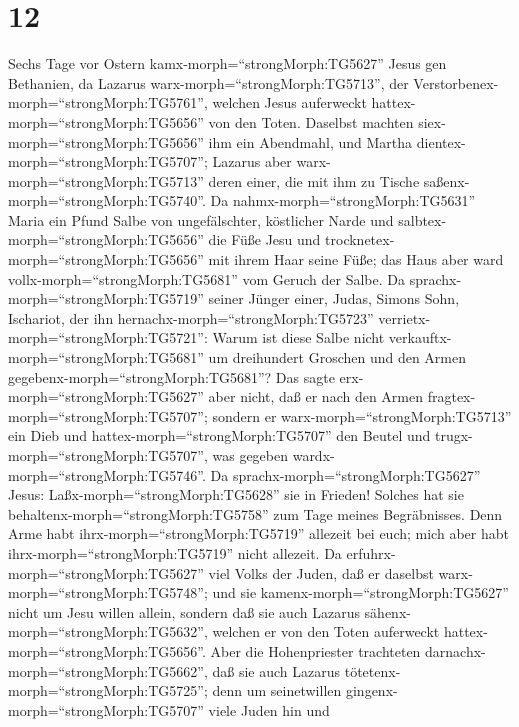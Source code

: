 \hypertarget{section-11}{%
\section{12}\label{section-11}}

 Sechs Tage vor Ostern kamx-morph=``strongMorph:TG5627''
Jesus gen Bethanien, da Lazarus warx-morph=``strongMorph:TG5713'', der
Verstorbenex-morph=``strongMorph:TG5761'', welchen Jesus auferweckt
hattex-morph=``strongMorph:TG5656'' von den Toten.  Daselbst
machten siex-morph=``strongMorph:TG5656'' ihm ein Abendmahl, und Martha
dientex-morph=``strongMorph:TG5707''; Lazarus aber
warx-morph=``strongMorph:TG5713'' deren einer, die mit ihm zu Tische
saßenx-morph=``strongMorph:TG5740''.  Da
nahmx-morph=``strongMorph:TG5631'' Maria ein Pfund Salbe von
ungefälschter, köstlicher Narde und salbtex-morph=``strongMorph:TG5656''
die Füße Jesu und trocknetex-morph=``strongMorph:TG5656'' mit ihrem Haar
seine Füße; das Haus aber ward vollx-morph=``strongMorph:TG5681'' vom
Geruch der Salbe.  Da sprachx-morph=``strongMorph:TG5719''
seiner Jünger einer, Judas, Simons Sohn, Ischariot, der ihn
hernachx-morph=``strongMorph:TG5723''
verrietx-morph=``strongMorph:TG5721'':  Warum ist diese
Salbe nicht verkauftx-morph=``strongMorph:TG5681'' um dreihundert
Groschen und den Armen gegebenx-morph=``strongMorph:TG5681''?
 Das sagte erx-morph=``strongMorph:TG5627'' aber nicht, daß
er nach den Armen fragtex-morph=``strongMorph:TG5707''; sondern er
warx-morph=``strongMorph:TG5713'' ein Dieb und
hattex-morph=``strongMorph:TG5707'' den Beutel und
trugx-morph=``strongMorph:TG5707'', was gegeben
wardx-morph=``strongMorph:TG5746''.  Da
sprachx-morph=``strongMorph:TG5627'' Jesus:
Laßx-morph=``strongMorph:TG5628'' sie in Frieden! Solches hat sie
behaltenx-morph=``strongMorph:TG5758'' zum Tage meines Begräbnisses.
 Denn Arme habt ihrx-morph=``strongMorph:TG5719'' allezeit
bei euch; mich aber habt ihrx-morph=``strongMorph:TG5719'' nicht
allezeit.  Da erfuhrx-morph=``strongMorph:TG5627'' viel
Volks der Juden, daß er daselbst warx-morph=``strongMorph:TG5748''; und
sie kamenx-morph=``strongMorph:TG5627'' nicht um Jesu willen allein,
sondern daß sie auch Lazarus sähenx-morph=``strongMorph:TG5632'',
welchen er von den Toten auferweckt hattex-morph=``strongMorph:TG5656''.
 Aber die Hohenpriester trachteten
darnachx-morph=``strongMorph:TG5662'', daß sie auch Lazarus
tötetenx-morph=``strongMorph:TG5725'';  denn um
seinetwillen gingenx-morph=``strongMorph:TG5707'' viele Juden hin und
